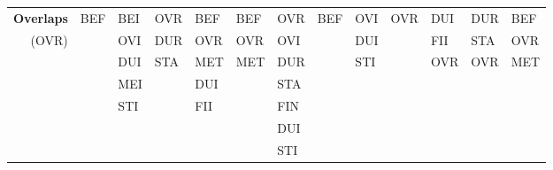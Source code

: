 \documentclass[11pt]{report}
\newenvironment{vvarmargin}[2]
{
  \begin{list}{}
  {
    \setlength{\topsep}{0pt}
    \setlength{\leftmargin}{0pt}
    \setlength{\rightmargin}{0pt}
    \setlength{\listparindent}{\parindent}
    \setlength{\itemindent}{\parindent}
    \setlength{\parsep}{0pt plus 1pt}
    \addtolength{\leftmargin}{#1}\addtolength{\rightmargin}{#2}
  }
  \item
}
{
  \end{list}
}
\begin{document}
\begin{table}[p]
\begin{vvarmargin}{-4cm}{-4cm}
\begin{center}
\begin{tabular}[t]{|r|l|l|l|l|l|l|l|l|l|l|l|l|}
                \hline
                \textbf{Overlaps}       & BEF                     & BEI                     & OVR                     & BEF                     & BEF                     & OVR                     & BEF                     & OVI                     & OVR                     & DUI                     & DUR                     & BEF                     \\
                (OVR)                   &                         & OVI                     & DUR                     & OVR                     & OVR                     & OVI                     &                         & DUI                     &                         & FII                     & STA                     & OVR                     \\
                                        &                         & DUI                     & STA                     & MET                     & MET                     & DUR                     &                         & STI                     &                         & OVR                     & OVR                     & MET                     \\
                                        &                         & MEI                     &                         & DUI                     &                         & STA                     &                         &                         &                         &                         &                         &                         \\
                                        &                         & STI                     &                         & FII                     &                         & FIN                     &                         &                         &                         &                         &                         &                         \\
                                        &                         &                         &                         &                         &                         & DUI                     &                         &                         &                         &                         &                         &                         \\
                                        &                         &                         &                         &                         &                         & STI                     &                         &                         &                         &                         &                         &                         \\

\end{tabular}
\end{center}
\end{vvarmargin}
\end{table}
\end{document}
